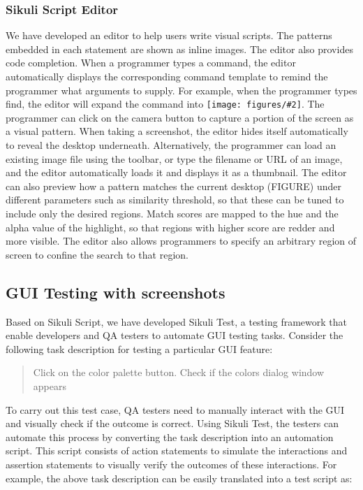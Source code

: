 \documentclass{chi2009}
\newcommand{\img}[2][0.2in]{\texttt{[image: figures/\#2]}}
\begin{document}
\subsubsection{Sikuli Script Editor}
We have developed an editor to help users write visual scripts. The
patterns embedded in each statement are shown as inline images. The editor also
provides code completion. When a programmer types a command, the editor
automatically displays the corresponding command template to remind the
programmer what arguments to supply. For example, when the programmer types
find, the editor will expand the command into \img[0.15in]{find-cam.png}. 
The programmer can click on the
camera button to capture a portion of the screen as a visual pattern. When
taking a screenshot, the editor hides itself automatically to reveal the
desktop underneath. Alternatively, the programmer can load an existing image
file using the toolbar, or type the filename or URL of an image, and the editor
automatically loads it and displays it as a thumbnail.  The editor can also
preview how a pattern matches the current desktop (FIGURE)
 under different
parameters such as similarity threshold, so that these can be tuned to include
only the desired regions. Match scores are mapped to the hue and the alpha
value of the highlight, so that regions with higher score are redder and more
visible. The editor also allows programmers to specify an arbitrary region of
screen to confine the search to that region.


\subsection{GUI Testing with screenshots}
Based on Sikuli Script, 
we have developed Sikuli Test, a testing framework that enable 
developers and QA testers to automate GUI testing tasks.
Consider the following task description for testing a particular
GUI feature:

\begin{quote}
Click on the color palette button. Check if the colors dialog
window appears
\end{quote}

To carry out this test case, QA testers need to manually interact
with the GUI and visually check if the outcome is correct. Using
Sikuli Test, the testers can automate this process by converting
the task description into an automation script. This script
consists of action statements to simulate the interactions
and assertion statements to visually verify the outcomes
of these interactions. For example,
the above task description can be easily translated into a test
script as:
\end{document}
